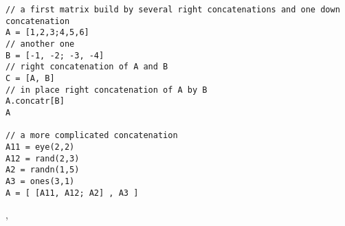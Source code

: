 \begin{examples}

\begin{Verbatim}
// a first matrix build by several right concatenations and one down concatenation 
A = [1,2,3;4,5,6]
// another one
B = [-1, -2; -3, -4]
// right concatenation of A and B
C = [A, B]
// in place right concatenation of A by B
A.concatr[B]
A

// a more complicated concatenation
A11 = eye(2,2)
A12 = rand(2,3)
A2 = randn(1,5)
A3 = ones(3,1)
A = [ [A11, A12; A2] , A3 ]
\end{Verbatim}


\end{examples}


\begin{manseealso}
, 
\end{manseealso}
